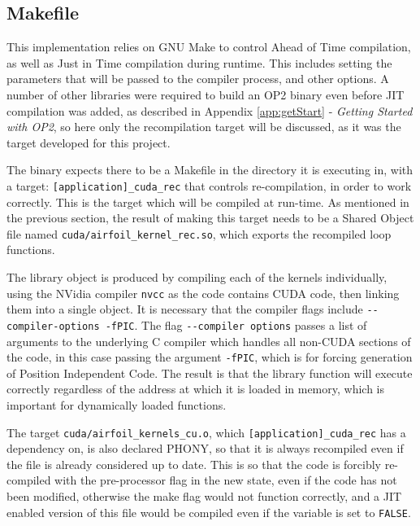 \subsection{Makefile}
\label{ss:make}
This implementation relies on GNU Make to control Ahead of Time compilation, as well as Just in Time compilation during runtime. This includes setting the parameters that will be passed to the compiler process, and other options. A number of other libraries were required to build an OP2 binary even before JIT compilation was added, as described in Appendix \ref{app:getStart} - \textit{Getting Started with OP2}, so here only the recompilation target will be discussed, as it was the target developed for this project.
\par
The binary expects there to be a Makefile in the directory it is executing in, with a target: \verb|[application]_cuda_rec| that controls re-compilation, in order to work correctly. This is the target which will be compiled at run-time. As mentioned in the previous section, the result of making this target needs to be a Shared Object file named \verb|cuda/airfoil_kernel_rec.so|, which exports the recompiled loop functions.
\par
The library object is produced by compiling each of the kernels individually, using the NVidia compiler \verb|nvcc| as the code contains CUDA code, then linking them into a single object. It is necessary that the compiler flags include \verb|--compiler-options -fPIC|. The flag \verb|--compiler options| passes a list of arguments to the underlying C compiler which handles all non-CUDA sections of the code, in this case passing the argument \verb|-fPIC|, which is for forcing generation of Position Independent Code. The result is that the library function will execute correctly regardless of the address at which it is loaded in memory, which is important for dynamically loaded functions.
\par
The target \verb|cuda/airfoil_kernels_cu.o|, which \verb|[application]_cuda_rec| has a dependency on, is also declared PHONY, so that it is always recompiled even if the file is already considered up to date. This is so that the code is forcibly re-compiled with the pre-processor flag in the new state, even if the code has not been modified, otherwise the make flag would not function correctly, and a JIT enabled version of this file would be compiled even if the variable is set to \verb|FALSE|.
